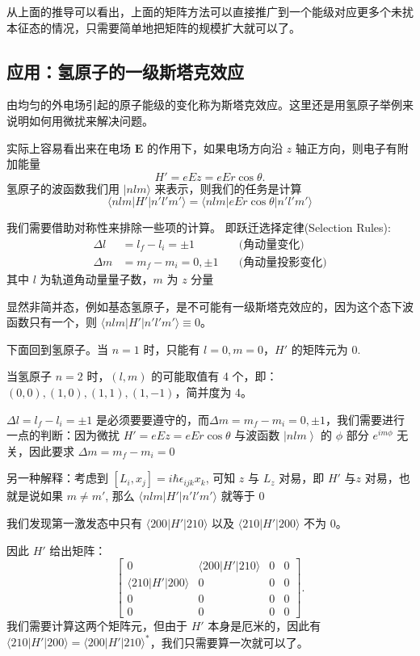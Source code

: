 从上面的推导可以看出，上面的矩阵方法可以直接推广到一个能级对应更多个未扰本征态的情况，只需要简单地把矩阵的规模扩大就可以了。



\subsection{应用：氢原子的一级斯塔克效应}
由均匀的外电场引起的原子能级的变化称为斯塔克效应。这里还是用氢原子举例来说明如何用微扰来解决问题。

实际上容易看出来在电场 $\boldsymbol{E}$ 的作用下，如果电场方向沿 $z$ 轴正方向，则电子有附加能量
\begin{equation}
	H' = eEz = eEr\cos\theta.
\end{equation}
氢原子的波函数我们用 $|nlm\rangle$ 来表示，则我们的任务是计算 \[\langle nlm|H'|n'l'm'\rangle = \langle nlm|eEr\cos\theta|n'l'm'\rangle\]

我们需要借助对称性来排除一些项的计算。
即跃迁选择定律(Selection Rules):
\begin{align}
	\Delta l &= l_f - l_i = \pm 1 \quad & \text{(角动量变化)} \\
	\Delta m &= m_f - m_i = 0, \pm 1 \quad & \text{(角动量投影变化)}
\end{align}
其中 $l$ 为轨道角动量量子数，$m$ 为 $z$ 分量

显然非简并态，例如基态氢原子，是不可能有一级斯塔克效应的，因为这个态下波函数只有一个，则 $\langle nlm|H'|n'l'm'\rangle \equiv 0$。

下面回到氢原子。当 $n=1$ 时，只能有 $l=0,m=0$，$H'$ 的矩阵元为 0.

当氢原子 $n=2$ 时，$(l,m)$ 的可能取值有 4 个，即：$(0,0),(1,0),(1,1),(1,-1)$，简并度为 4。

$\Delta l = {l_f} - {l_i} =  \pm 1$ 是必须要要遵守的，而\(\Delta m = m_f - m_i = 0, \pm 1\)，我们需要进行一点的判断：因为微扰 \(H' = eEz = eEr\cos\theta\) 与波函数 $\left| {nlm} \right\rangle $ 的 $\phi $ 部分 ${e^{im\phi }}$ 无关，因此要求 \(\Delta m = m_f - m_i = 0\)

另一种解释：考虑到 \(\left[L_{i}, x_{j}\right] = i\hbar\epsilon_{i j k} x_{k}\), 可知 \(z\) 与 \(L_z\) 对易，即 \(H'\) 与\(z\) 对易，也就是说如果 \(m \ne m'\), 那么 $\langle nlm|H'|n'l'm'\rangle $ 就等于 \(0 \)

我们发现第一激发态中只有 $\langle 200 | H' | 210 \rangle$ 以及 $\langle 210 | H' | 200 \rangle$ 不为 0。

因此 $H'$ 给出矩阵：
\begin{equation}
	\begin{bmatrix}
		0 & \langle 200 | H' | 210 \rangle & 0 & 0 \\
		\langle 210 | H' | 200 \rangle & 0 & 0 & 0 \\
		0 & 0 & 0 & 0 \\
		0 & 0 & 0 & 0
	\end{bmatrix}.
\end{equation}
我们需要计算这两个矩阵元，但由于 $H'$ 本身是厄米的，因此有 $\langle 210 | H' | 200 \rangle = \langle 200 | H' | 210 \rangle^{*}$，我们只需要算一次就可以了。
